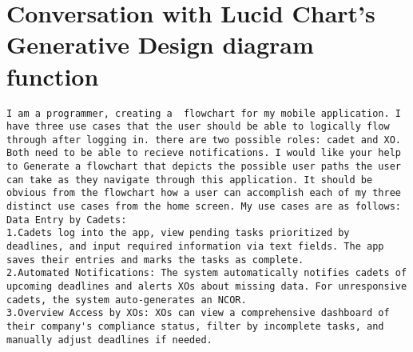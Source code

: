 \documentclass [11pt]{article}
\begin{document}
\section{Conversation with Lucid Chart's Generative Design diagram function}
\begin{lstlisting}
I am a programmer, creating a  flowchart for my mobile application. I have three use cases that the user should be able to logically flow through after logging in. there are two possible roles: cadet and XO. Both need to be able to recieve notifications. I would like your help to Generate a flowchart that depicts the possible user paths the user can take as they navigate through this application. It should be obvious from the flowchart how a user can accomplish each of my three distinct use cases from the home screen. My use cases are as follows: Data Entry by Cadets: 
1.Cadets log into the app, view pending tasks prioritized by deadlines, and input required information via text fields. The app saves their entries and marks the tasks as complete. 
2.Automated Notifications: The system automatically notifies cadets of upcoming deadlines and alerts XOs about missing data. For unresponsive cadets, the system auto-generates an NCOR. 
3.Overview Access by XOs: XOs can view a comprehensive dashboard of their company's compliance status, filter by incomplete tasks, and manually adjust deadlines if needed.

\end{lstlisting}
\end{document}
